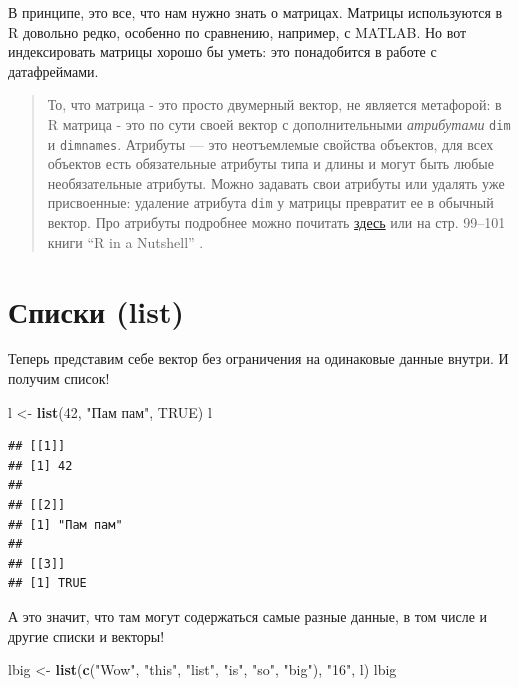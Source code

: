\documentclass[]{book}
\newenvironment{Shaded}{\begin{snugshade}}{\end{snugshade}}
\newcommand{\DecValTok}[1]{\textcolor[rgb]{0.00,0.00,0.81}{#1}}
\newcommand{\KeywordTok}[1]{\textcolor[rgb]{0.13,0.29,0.53}{\textbf{#1}}}
\newcommand{\NormalTok}[1]{#1}
\newcommand{\OtherTok}[1]{\textcolor[rgb]{0.56,0.35,0.01}{#1}}
\newcommand{\StringTok}[1]{\textcolor[rgb]{0.31,0.60,0.02}{#1}}
\begin{document}
В принципе, это все, что нам нужно знать о матрицах. Матрицы используются в R довольно редко, особенно по сравнению, например, с MATLAB. Но вот индексировать матрицы хорошо бы уметь: это понадобится в работе с датафреймами.

\begin{quote}
То, что матрица - это просто двумерный вектор, не является метафорой: в R матрица - это по сути своей вектор с дополнительными \emph{атрибутами} \texttt{dim} и \texttt{dimnames}. Атрибуты --- это неотъемлемые свойства объектов, для всех объектов есть обязательные атрибуты типа и длины и могут быть любые необязательные атрибуты. Можно задавать свои атрибуты или удалять уже присвоенные: удаление атрибута \texttt{dim} у матрицы превратит ее в обычный вектор. Про атрибуты подробнее можно почитать \href{https://perso.esiee.fr/~courivad/R/06-objects.html}{здесь} или на стр. 99--101 книги ``R in a Nutshell'' \citep{adler2010r}.
\end{quote}

\hypertarget{list}{%
\section{Списки (list)}\label{list}}

Теперь представим себе вектор без ограничения на одинаковые данные внутри. И получим список!

\begin{Shaded}
\begin{Highlighting}[]
\NormalTok{l <-}\StringTok{ }\KeywordTok{list}\NormalTok{(}\DecValTok{42}\NormalTok{, }\StringTok{"Пам пам"}\NormalTok{, }\OtherTok{TRUE}\NormalTok{)}
\NormalTok{l}
\end{Highlighting}
\end{Shaded}

\begin{verbatim}
## [[1]]
## [1] 42
## 
## [[2]]
## [1] "Пам пам"
## 
## [[3]]
## [1] TRUE
\end{verbatim}

А это значит, что там могут содержаться самые разные данные, в том числе и другие списки и векторы!

\begin{Shaded}
\begin{Highlighting}[]
\NormalTok{lbig <-}\StringTok{ }\KeywordTok{list}\NormalTok{(}\KeywordTok{c}\NormalTok{(}\StringTok{"Wow"}\NormalTok{, }\StringTok{"this"}\NormalTok{, }\StringTok{"list"}\NormalTok{, }\StringTok{"is"}\NormalTok{, }\StringTok{"so"}\NormalTok{, }\StringTok{"big"}\NormalTok{), }\StringTok{"16"}\NormalTok{, l)}
\NormalTok{lbig}
\end{Highlighting}
\end{Shaded}
\end{document}
